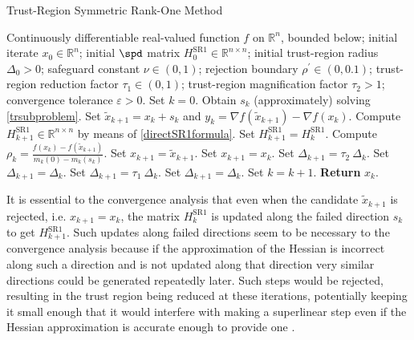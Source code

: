 \begin{algorithm}[H]
    \caption{Trust-Region Symmetric Rank-One Method}\label{TR-SR1Method}
    \begin{algorithmic}[1]
        \State Continuously differentiable real-valued function $f$ on $\mathbb{R}^n$, bounded below; initial iterate $x_0 \in \mathbb{R}^n$; initial $\spd$ matrix $H^{\mathrm{SR1}}_0 \in \mathbb{R}^{n \times n}$; initial trust-region radius $\Delta_0 > 0$; safeguard constant $\nu \in (0,1)$; rejection boundary $\rho^{\prime} \in (0, 0.1)$; trust-region reduction factor $\tau_1 \in (0,1)$; trust-region magnification factor $\tau_2 > 1$; convergence tolerance $\varepsilon > 0$. Set $k = 0$.
            \State Obtain $s_k$ (approximately) solving \cref{trsubproblem}.
            \State Set $\widetilde{x}_{k+1} = x_k + s_k$ and $y_k = \nabla f(\widetilde{x}_{k+1}) - \nabla f(x_k)$.
                \State Compute $H^{\mathrm{SR1}}_{k+1} \in \mathbb{R}^{n \times n}$ by means of \cref{directSR1formula}.
			\Else 
				\State Set $H^{\mathrm{SR1}}_{k+1} = H^{\mathrm{SR1}}_k$.
            \EndIf 
            \State Compute $\rho_k = \frac{f(x_k) - f(\widetilde{x}_{k+1})}{m_k(0) - m_k(s_k)}$.
                \State Set $x_{k+1} = \widetilde{x}_{k+1}$.
			\Else 
				\State Set $x_{k+1} = x_k$.
            \EndIf 
                    \State Set $\Delta_{k+1} = \tau_2 \ \Delta_k$.
                \Else 
                    \State Set $\Delta_{k+1} = \Delta_k$.
                \EndIf 
			\Else 
                    \State Set $\Delta_{k+1} = \tau_1 \ \Delta_k$.
                \Else 
                    \State Set $\Delta_{k+1} = \Delta_k$.
                \EndIf 
            \EndIf 
            \State Set $k = k+1$.
        \EndWhile
        \State \textbf{Return} $x_k$.
    \end{algorithmic}
\end{algorithm}

It is essential to the convergence analysis that even when the candidate $\widetilde{x}_{k+1}$ is rejected, i.e. $x_{k+1} = x_k$, the matrix $H^{\mathrm{SR1}}_k$ is updated along the failed direction $s_k$ to get $H^{\mathrm{SR1}}_{k+1}$. Such updates along failed directions seem to be necessary to the convergence analysis because if the approximation of the Hessian is incorrect along such a direction and is not updated along that direction very similar directions could be generated repeatedly later. Such steps would be rejected, resulting in the trust region being reduced at these iterations, potentially keeping it small enough that it would interfere with making a superlinear step even if the Hessian approximation is accurate enough to provide one \cite[p.~1028]{ByrdKhalfanSchnabel:1996}. 






